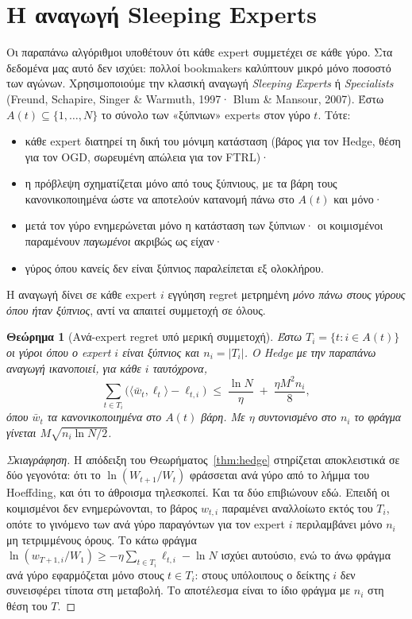 \documentclass[12pt,a4paper,oneside]{report}
\renewcommand{\_}{\oldunderscore\allowbreak}
\theoremstyle{definition}
\theoremstyle{plain}
\newtheorem{theorem}{Θεώρημα}[chapter]
\theoremstyle{remark}
\begin{document}
\section{Η αναγωγή Sleeping Experts}
\label{sec:sleeping}

Οι παραπάνω αλγόριθμοι υποθέτουν ότι κάθε expert συμμετέχει σε κάθε γύρο. Στα δεδομένα μας
αυτό δεν ισχύει: πολλοί bookmakers καλύπτουν μικρό μόνο ποσοστό των αγώνων. Χρησιμοποιούμε
την κλασική αναγωγή \emph{Sleeping Experts} ή \emph{Specialists} (Freund, Schapire, Singer
\& Warmuth, 1997· Blum \& Mansour, 2007). Έστω $A(t) \subseteq \{1,\dots,N\}$ το σύνολο των
«ξύπνιων» experts στον γύρο $t$. Τότε:

\begin{itemize}
  \item κάθε expert διατηρεί τη δική του μόνιμη κατάσταση (βάρος για τον Hedge, θέση για τον
        OGD, σωρευμένη απώλεια για τον FTRL)·
  \item η πρόβλεψη σχηματίζεται μόνο από τους ξύπνιους, με τα βάρη τους κανονικοποιημένα ώστε
        να αποτελούν κατανομή πάνω στο $A(t)$ και μόνο·
  \item μετά τον γύρο ενημερώνεται μόνο η κατάσταση των ξύπνιων· οι κοιμισμένοι παραμένουν
        \emph{παγωμένοι} ακριβώς ως είχαν·
  \item γύρος όπου κανείς δεν είναι ξύπνιος παραλείπεται εξ ολοκλήρου.
\end{itemize}

Η αναγωγή δίνει σε κάθε expert $i$ εγγύηση regret μετρημένη \emph{μόνο πάνω στους γύρους
όπου ήταν ξύπνιος}, αντί να απαιτεί συμμετοχή σε όλους.

\begin{theorem}[Ανά-expert regret υπό μερική συμμετοχή]
\label{thm:sleeping}
Έστω $T_i = \{t : i \in A(t)\}$ οι γύροι όπου ο expert $i$ είναι ξύπνιος και $n_i = |T_i|$.
Ο Hedge με την παραπάνω αναγωγή ικανοποιεί, για κάθε $i$ ταυτόχρονα,
\[
\sum_{t \in T_i} \Big( \langle \bar{w}_t, \ell_t\rangle - \ell_{t,i} \Big)
\;\leq\; \frac{\ln N}{\eta} \;+\; \frac{\eta M^2 n_i}{8},
\]
όπου $\bar{w}_t$ τα κανονικοποιημένα στο $A(t)$ βάρη. Με $\eta$ συντονισμένο στο $n_i$ το
φράγμα γίνεται $M\sqrt{n_i \ln N/2}$.
\end{theorem}

\begin{proof}[Σκιαγράφηση]
Η απόδειξη του Θεωρήματος~\ref{thm:hedge} στηρίζεται αποκλειστικά σε δύο γεγονότα: ότι το
$\ln(W_{t+1}/W_t)$ φράσσεται ανά γύρο από το λήμμα του Hoeffding, και ότι το άθροισμα
τηλεσκοπεί. Και τα δύο επιβιώνουν εδώ. Επειδή οι κοιμισμένοι δεν ενημερώνονται, το βάρος
$w_{t,i}$ παραμένει αναλλοίωτο εκτός του $T_i$, οπότε το γινόμενο των ανά γύρο παραγόντων
για τον expert $i$ περιλαμβάνει μόνο $n_i$ μη τετριμμένους όρους. Το κάτω φράγμα
$\ln(w_{T+1,i}/W_1) \geq -\eta\sum_{t\in T_i}\ell_{t,i} - \ln N$ ισχύει αυτούσιο, ενώ το άνω
φράγμα ανά γύρο εφαρμόζεται μόνο στους $t \in T_i$: στους υπόλοιπους ο δείκτης $i$ δεν
συνεισφέρει τίποτα στη μεταβολή. Το αποτέλεσμα είναι το ίδιο φράγμα με $n_i$ στη θέση του
$T$.
\end{proof}
\end{document}

